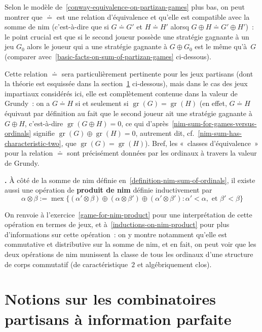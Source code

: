 \documentclass[12pt,a4paper]{article}
\theoremstyle{definition}
\newcommand\thingy{%
\refstepcounter{comcnt}\smallskip\noindent\textbf{\thecomcnt.} }
\newcommand{\mex}{\operatorname{mex}}
\newcommand{\gr}{\operatorname{gr}}
\newcommand{\defin}[2][]{\def\latexsucks{#1}\ifx\latexsucks\empty\index{#2}\else\index{\latexsucks}\fi\textbf{#2}}
\begin{document}
Selon le modèle de \ref{conway-equivalence-on-partizan-games} plus
bas, on peut montrer que $\doteq$ est une relation d'équivalence et
qu'elle est compatible avec la somme de nim (c'est-à-dire que si
$G\doteq G'$ et $H\doteq H'$ alorsq $G\oplus H \doteq G'\oplus H'$) :
le point crucial est que si le second joueur possède une stratégie
gagnante à un jeu $G_0$ alors le joueur qui a une stratégie gagnante à
$G\oplus G_0$ est le même qu'à $G$ (comparer
avec \ref{basic-facts-on-sum-of-partizan-games} ci-dessous).

Cette relation $\doteq$ sera particulièrement pertinente pour les jeux
partisans (dont la théorie est esquissée dans la
section \ref{section-combinatorial-partizan-games} ci-dessous), mais
dans le cas des jeux impartiaux considérés ici, elle est complètement
contenue dans la valeur de Grundy : on a $G\doteq H$ si et seulement
si $\gr(G) = \gr(H)$ (en effet, $G\doteq H$ équivaut par définition au
fait que le second joueur ait une stratégie gagnante à $G\oplus H$,
c'est-à-dire $\gr(G\oplus H) = 0$, ce qui
d'après \ref{nim-sum-for-games-versus-ordinals} signifie $\gr(G)
\oplus \gr(H) = 0$, autrement dit,
cf. \ref{nim-sum-has-characteristic-two}, que $\gr(G) = \gr(H)$).
Bref, les « classes d'équivalence » pour la relation $\doteq$ sont
précisément données par les ordinaux à travers la valeur de Grundy.

\thingy À côté de la somme de nim définie
en \ref{definition-nim-sum-of-ordinals}, il existe aussi une opération
de \defin{produit de nim}
définie inductivement par
\[
\alpha\otimes\beta := \mex\Big\{(\alpha'\otimes\beta)
\oplus (\alpha\otimes\beta') \oplus (\alpha'\otimes\beta')
: \alpha'<\alpha,\text{~et~}\beta'<\beta\Big\}
\]

On renvoie à l'exercice \ref{game-for-nim-product} pour une
interprétation de cette opération en termes de jeux, et
à \ref{inductions-on-nim-product} pour plus d'informations sur cette
opération : on y montre notamment qu'elle est commutative et
distributive sur la somme de nim, et en fait, on peut voir que les
deux opérations de nim munissent la classe de tous les ordinaux d'une
structure de corps commutatif (de caractéristique $2$ et
algébriquement clos).



%
%
%

\section{Notions sur les combinatoires partisans à information parfaite}\label{section-combinatorial-partizan-games}
\end{document}
